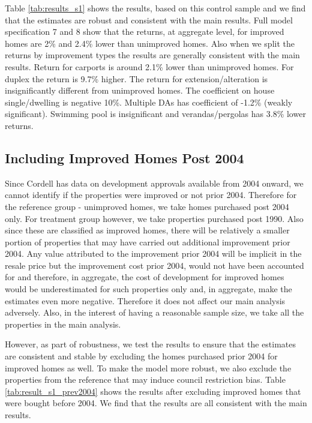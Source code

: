 \documentclass{article}
\begin{document}
Table \ref{tab:results_s1} shows the results, based on this control sample and we find that the estimates are robust and consistent with the main results. Full model specification 7 and 8 show that the returns, at aggregate level, for improved homes are 2\% and 2.4\% lower than unimproved homes. Also when we split the returns by improvement types the results are generally consistent with the main results. Return for carports is around 2.1\% lower than unimproved homes. For duplex the return is 9.7\% higher. The return for extension/alteration is insignificantly different from unimproved homes. The coefficient on house single/dwelling is negative 10\%. Multiple DAs has coefficient of -1.2\% (weakly significant). Swimming pool is insignificant and verandas/pergolas has 3.8\% lower returns.

\clearpage
{}

\restoregeometry

\clearpage
{}

\restoregeometry

\subsection{Including Improved Homes Post 2004}

Since Cordell has data on development approvals available from 2004 onward, we cannot identify if the properties were improved or not prior 2004. Therefore for the reference group - unimproved homes, we take homes purchased post 2004 only. For treatment group however, we take properties purchased post 1990. Also since these are classified as improved homes, there will be relatively a smaller portion of properties that may have carried out additional improvement prior 2004. Any value attributed to the improvement prior 2004 will be implicit in the resale price but the improvement cost prior 2004, would not have been accounted for and therefore, in aggregate, the cost of development for improved homes would be underestimated for such properties only and, in aggregate, make the estimates even more negative. Therefore it does not affect our main analysis adversely. Also, in the interest of having a reasonable sample size, we take all the properties in the main analysis.

However, as part of robustness, we test the results to ensure that the estimates are consistent and stable by excluding the homes purchased prior 2004 for improved homes as well. To make the model more robust, we also exclude the properties from the reference that may induce council restriction bias. Table \ref{tab:result_s1_prev2004} shows the results after excluding improved homes that were bought before 2004. We find that the results are all consistent with the main results.
\end{document}
